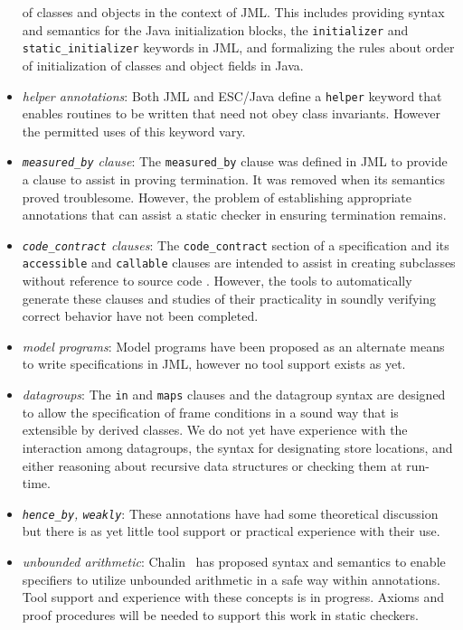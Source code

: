 \documentclass{acm_proc_article-sp}
\begin{document}
\begin{itemize}
of classes and objects in the context of JML.  This includes providing syntax and semantics for the
Java initialization blocks, the \texttt{initializer} and \texttt{static\_initializer} keywords in
JML, and formalizing the rules about order of initialization of classes and object fields in Java.
\item \textit{helper annotations}:  Both JML and ESC/Java define a \texttt{helper} keyword that enables 
routines to be written that need not obey class invariants.  However the permitted uses of this
keyword vary.
\item \textit{\texttt{measured\_by} clause}:  The \texttt{measured\_by} clause was defined in JML to
provide a clause to assist in proving termination.  It was removed when its semantics
proved troublesome.  However, the problem of establishing appropriate annotations that
can assist a static checker in ensuring termination remains.
\item \textit{\texttt{code\_contract} clauses}:  The \texttt{code\_contract} section of a specification and its
\texttt{accessible} and \texttt{callable} clauses are intended to assist in creating subclasses 
without reference to source code \cite{Ruby-Leavens00}.  However, the tools to automatically
generate these clauses and studies of their practicality in soundly verifying correct behavior have
not been completed.
\item \textit{model programs}:  Model programs have been proposed as an alternate means to write
specifications in JML, however no tool support exists as yet.
\item \textit{datagroups}:  The \texttt{in} and \texttt{maps} clauses and the datagroup syntax are designed
to allow the specification of frame conditions in a sound way that is extensible by derived classes. 
We do not yet have experience with the interaction among datagroups, the syntax for designating store locations, and either reasoning about recursive data structures or checking them at 
run-time.
\item \textit{\texttt{hence\_by}, \texttt{weakly}}:  These annotations have had some theoretical discussion but
there is as yet little tool support or practical experience with their use.
\item \textit{unbounded
  arithmetic}:  Chalin~\cite{Chalin03} has proposed syntax and semantics to enable specifiers to utilize unbounded arithmetic in a safe way within annotations.  Tool support and experience with
these concepts is in progress.  Axioms and proof procedures will be needed to support this work
in static checkers.
\end{itemize}
\end{document}
